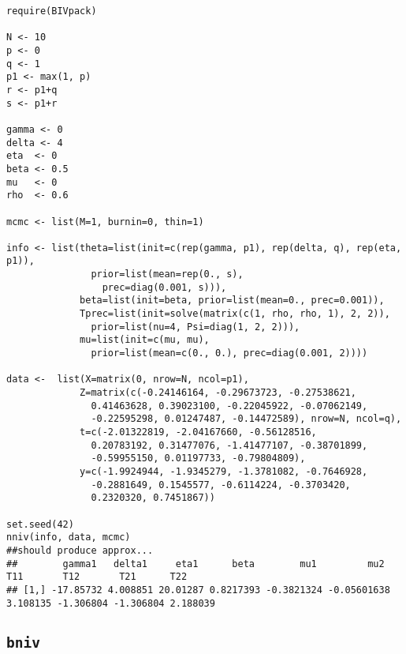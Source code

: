 \documentclass[12pt,oneside]{article}
\begin{document}
\begin{verbatim}
require(BIVpack)

N <- 10
p <- 0
q <- 1
p1 <- max(1, p)
r <- p1+q
s <- p1+r

gamma <- 0
delta <- 4 
eta  <- 0
beta <- 0.5
mu   <- 0
rho  <- 0.6

mcmc <- list(M=1, burnin=0, thin=1)

info <- list(theta=list(init=c(rep(gamma, p1), rep(delta, q), rep(eta, p1)),
               prior=list(mean=rep(0., s),
                 prec=diag(0.001, s))),
             beta=list(init=beta, prior=list(mean=0., prec=0.001)),
             Tprec=list(init=solve(matrix(c(1, rho, rho, 1), 2, 2)),
               prior=list(nu=4, Psi=diag(1, 2, 2))),
             mu=list(init=c(mu, mu),
               prior=list(mean=c(0., 0.), prec=diag(0.001, 2))))

data <-  list(X=matrix(0, nrow=N, ncol=p1),
             Z=matrix(c(-0.24146164, -0.29673723, -0.27538621,
               0.41463628, 0.39023100, -0.22045922, -0.07062149,
               -0.22595298, 0.01247487, -0.14472589), nrow=N, ncol=q),
             t=c(-2.01322819, -2.04167660, -0.56128516,
               0.20783192, 0.31477076, -1.41477107, -0.38701899,
               -0.59955150, 0.01197733, -0.79804809),
             y=c(-1.9924944, -1.9345279, -1.3781082, -0.7646928,
               -0.2881649, 0.1545577, -0.6114224, -0.3703420,
               0.2320320, 0.7451867))

set.seed(42)
nniv(info, data, mcmc)
##should produce approx...
##        gamma1   delta1     eta1      beta        mu1         mu2      T11       T12       T21      T22
## [1,] -17.85732 4.008851 20.01287 0.8217393 -0.3821324 -0.05601638 3.108135 -1.306804 -1.306804 2.188039
\end{verbatim}
\pagebreak

\subsection{\texttt{bniv}}
\end{document}
